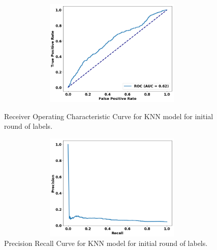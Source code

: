 \begin{figure}
\centering
\begin{minipage}[b]{.4\textwidth}
\includegraphics[trim=0in 0.1in 0.1in 0.in,clip,width=1.0\textwidth,height=2in]{figures/roc_init.png}
\caption{Receiver Operating Characteristic Curve for KNN model for initial round of labels.}\label{fig:roc_init}
\end{minipage}\qquad
\begin{minipage}[b]{.4\textwidth}
\includegraphics[trim=0in 0.1in 0.1in 0.in,clip,width=1.0\textwidth,height=2in]{figures/prc_init.png}
\caption{Precision Recall Curve for KNN model for initial round of labels.}\label{fig:prc_init}
\end{minipage}


\end{figure}
